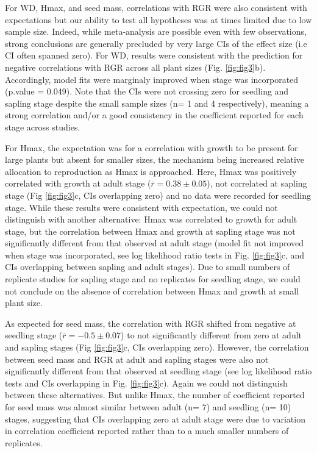\documentclass[a4paper,11pt]{article}
\begin{document}
For WD, Hmax, and seed mass, correlations with RGR were also consistent with expectations but our ability to test all hypotheses was at times limited due to low sample size. Indeed, while meta-analysis are possible even with few observations, strong conclusions are generally precluded by very large CIs of the effect size (i.e CI often spanned zero). 
For WD, results were consistent with the prediction for negative correlations with RGR across all plant sizes (Fig. \ref{fig:fig3}b). Accordingly, model fits were marginaly improved when stage was incorporated (p.value = 0.049). Note that the CIs were not crossing zero for seedling and sapling stage despite the small sample sizes (n= 1 and 4 respectively), meaning a strong correlation and/or a good consistency in the coefficient reported for each stage across studies. 

For Hmax, the expectation was for a correlation with growth to be present for large plants but absent for smaller sizes, the mechanism being increased relative allocation to reproduction as Hmax is approached. Here, Hmax was positively correlated with growth at adult stage ($\bar{r}= 0.38 \pm 0.05$), not correlated at sapling stage (Fig \ref{fig:fig3}c, CIs overlapping zero) and no data were recorded for seedling stage. 
While these results were consistent with expectation, we could not distinguish with another alternative: Hmax was correlated to growth for adult stage, but the correlation between Hmax and growth at sapling stage was not significantly different from that observed at adult stage (model fit not improved when stage was incorporated, see log likelihood ratio tests in Fig. \ref{fig:fig3}c, and CIs overlapping between sapling and adult stages). Due to small numbers of replicate studies for sapling stage and no replicates for seedling stage, we could not conclude on the absence of correlation between Hmax and growth at small plant size.

As expected for seed mass, the correlation with RGR shifted from negative at seedling stage ($\bar{r}= -0.5 \pm 0.07$) to not significantly different from zero at adult and sapling stages (Fig \ref{fig:fig3}c, CIs overlapping zero). However, the correlation between seed mass and RGR at adult and sapling stages were also not significantly different from that observed at seedling stage (see log likelihood ratio tests and CIs overlapping in Fig. \ref{fig:fig3}c). Again we could not distinguish between these alternatives. But unlike Hmax, the number of coefficient reported for seed mass was almost similar between adult (n= 7) and seedling (n= 10) stages, suggesting that CIs overlapping zero at adult stage were due to variation in correlation coefficient reported rather than to a much smaller numbers of replicates.
\end{document}
